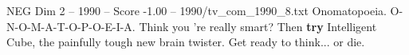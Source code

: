 \begin{textsample}{NEG Dim 2 – 1990 – Score -1.00 – 1990/tv\_com\_1990\_8.txt}  \label{ex:f2_neg_068}
Onomatopoeia.
O-N-O-M-A-T-O-P-O-E-I-A.
Think you 're really smart?
Then \textbf{try} Intelligent Cube, the painfully tough new brain twister.
Get ready to think... or die.

\end{textsample}
